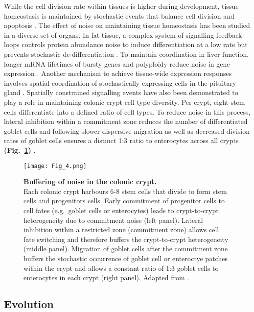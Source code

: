While the cell division rate within tissues is higher during development, tissue homeostasis is maintained by stochastic events that balance cell division and apoptosis \citep{Ranft2010}. 
The effect of noise on maintaining tissue homeostasis has been studied in a diverse set of organs. 
In fat tissue, a complex system of signalling feedback loops controls protein abundance noise to induce differentiation at a low rate but prevents stochastic de-differentiation \citep{Ahrends2014}. 
To maintain coordination in liver function, longer mRNA lifetimes of bursty genes and polyploidy reduce noise in gene expression \citep{BaharHalpern2015}. 
Another mechanism to achieve tissue-wide expression responses involves spatial coordination of stochastically expressing cells in the pituitary gland \citep{Featherstone2016}. 
Spatially constrained signalling events have also been demonstrated to play a role in maintaining colonic crypt cell type diversity. 
Per crypt, eight stem cells differentiate into a defined ratio of cell types. To reduce noise in this process, lateral inhibition within a commitment zone reduces the number of differentiated goblet cells and following slower dispersive migration as well as decreased division rates of goblet cells ensures a distinct 1:3 ratio to enterocytes across all crypts \textbf{(Fig.~\ref{fig0:noise_tissue})} \citep{Toth2017}.

\begin{figure}[!h]
\centering
\texttt{[image: Fig\_4.png]}
\caption[Buffering of noise in the colonic crypt]{\textbf{Buffering of noise in the colonic crypt.}\\
Each colonic crypt harbours 6-8 stem cells that divide to form stem cells and progenitors cells. 
Early commitment of progenitor cells to cell fates (e.g.~goblet cells or enterocytes) leads to crypt-to-crypt heterogeneity due to commitment noise (left panel). 
Lateral inhibition within a restricted zone (commitment zone) allows cell fate switching and therefore buffers the crypt-to-crypt heterogeneity (middle panel). 
Migration of goblet cells after the commitment zone buffers the stochastic occurrence of goblet cell or enteroctye patches within the crypt and allows a constant ratio of 1:3 goblet cells to enterocytes in each crypt (right panel). 
Adapted from \citep{Toth2017}.}
\label{fig0:noise_tissue}
\end{figure}

\subsection{Evolution}

